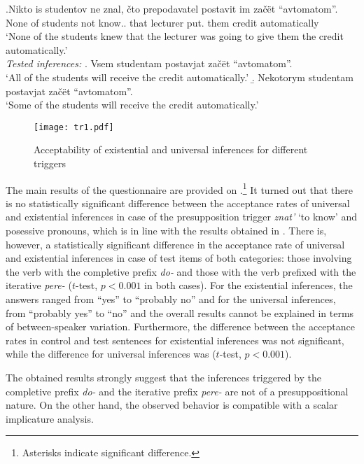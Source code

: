 \exg.\label{ex:znat}Nikto is studentov ne znal, \v{c}to prepodavatel postavit im za\v{c}\"{e}t ``avtomatom''.\\
None of students not know.. that lecturer put. them credit automatically\\
\trans `None of the students knew that the lecturer was going to give them the credit automatically.'\smallskip\\
\textit{Tested inferences:}
\a. Vsem studentam postavjat za\v{c}\"et ``avtomatom''.\\
 `All of the students will receive the credit automatically.'
\b. Nekotorym studentam postavjat za\v{c}\"et ``avtomatom''.\\
 `Some of the students will receive the credit automatically.'

\begin{figure}
\texttt{[image: tr1.pdf]}
\caption{Acceptability of existential and universal inferences for different triggers}
\label{fig:results}
\end{figure}

The main results of the questionnaire are provided on .\footnote{Asterisks indicate significant difference.} It turned out that there is no statistically significant difference between the acceptance rates of universal and existential inferences in case of the presupposition trigger \textit{znat'} `to know' and posessive pronouns, which is in line with the results obtained in \citealt{Chemla:09}. There is, however, a statistically significant difference in the acceptance rate of universal and existential inferences in case of test items of both categories: those involving the verb with the completive prefix \textit{do-} and those with the verb prefixed with the iterative \textit{pere-} ($t$-test, $p<0.001$ in both cases). For the existential inferences, the answers ranged from ``yes'' to ``probably no'' and for the universal inferences, from ``probably yes'' to ``no'' and the overall results cannot be explained in terms of between-speaker variation. Furthermore, the difference between the acceptance rates in control and
test sentences for existential inferences was not significant, while the
difference for universal inferences was ($t$-test, $p<0.001$).

The obtained results strongly suggest that the inferences triggered by the completive prefix \textit{do-} and the iterative prefix \textit{pere-} are not of a presuppositional nature. On the other hand, the observed behavior is compatible with a scalar implicature analysis.

